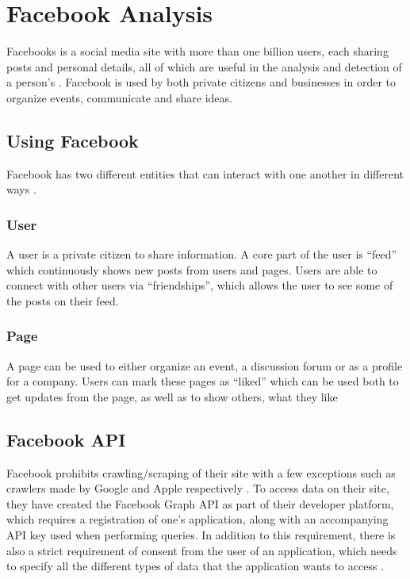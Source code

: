 \section{Facebook Analysis}\label{sec:facebook-analysis}
Facebooks is a social media site with more than one billion users, each
sharing posts and personal details, all of which are useful in the analysis and
detection of a person's \fbp. Facebook is used by both private citizens and
businesses in order to organize events, communicate and share ideas. 

\subsection{Using Facebook}
Facebook has two different entities that can interact with one another in
different ways \Source.

\subsubsection{User}
A user is a private citizen to share information. A core part of the user is
``feed'' which continuously shows new posts from users and pages. Users are able
to connect with other users via ``friendships'', which allows the user to see
some of the posts on their feed.

\subsubsection{Page}
A page can be used to either organize an event, a discussion forum or as a
profile for a company. Users can mark these pages as ``liked'' which can be
used both to get updates from the page, as well as to show others, what they
like

\subsection{Facebook API}
Facebook prohibits crawling/scraping of their site with a few exceptions such as
crawlers made by Google and Apple respectively
\citep{FacebookRobotsTxt}.
To access data on their site, they have created the Facebook Graph \ac{API} as
part of their developer platform, which requires a registration of one's
application, along with an accompanying \ac{API} key used when performing
queries.
In addition to this requirement, there is also a strict requirement of consent
from the user of an application, which needs to specify all the different types
of data that the application wants to access
\citep{FacebookGraphApiAccessTokens} \Source .\nl

